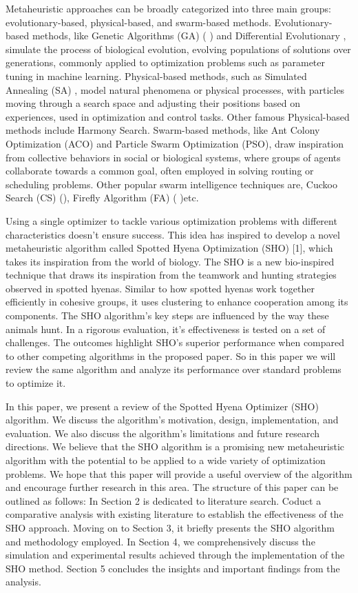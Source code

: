 \documentclass[12pt]{article}
\begin{document}
Metaheuristic approaches can be broadly categorized into three main groups: evolutionary-based, physical-based, and swarm-based methods. 
Evolutionary-based methods, like Genetic Algorithms (GA) ( \cite{mirjalili2019genetic}) and Differential Evolutionary , simulate the process of biological evolution, evolving populations of solutions over generations, commonly applied to optimization problems such as parameter tuning in machine learning. 
Physical-based methods, such as Simulated Annealing (SA) , model natural phenomena or physical processes, with particles moving through a search space and adjusting their positions based on experiences, used in optimization and control tasks. Other famous Physical-based methods include Harmony Search. 
Swarm-based methods, like Ant Colony Optimization (ACO) and Particle Swarm Optimization (PSO), draw inspiration from collective behaviors in social or biological systems, where groups of agents collaborate towards a common goal, often employed in solving routing or scheduling problems.
Other popular swarm intelligence techniques are, Cuckoo Search (CS) (\cite{yang2010engineering}), Firefly Algorithm (FA) (\cite{yang2010firefly} )etc.

Using a single optimizer to tackle various optimization problems with different characteristics doesn't ensure success. This idea has inspired to develop a novel metaheuristic algorithm called Spotted Hyena Optimization (SHO) [1], which takes its inspiration from the world of biology. 
The SHO is a new bio-inspired technique that draws its inspiration from the teamwork and hunting strategies observed in spotted hyenas. Similar to how spotted hyenas work together efficiently in cohesive groups, it uses clustering to enhance cooperation among its components. 
The SHO algorithm's key steps are influenced by the way these animals hunt. In a rigorous evaluation, it's effectiveness is tested on a set of challenges. 
The outcomes highlight SHO's superior performance when compared to other competing algorithms in the proposed paper.   
So in this paper we will review the same algorithm and analyze its performance over standard problems to optimize it.

In this paper, we present a review of the Spotted Hyena Optimizer (SHO) algorithm. We discuss the algorithm's motivation, design, implementation, and evaluation. We also discuss the algorithm's limitations and future research directions. We believe that the SHO algorithm is a promising new metaheuristic algorithm with the potential to be applied to a wide variety of optimization problems. We hope that this paper will provide a useful overview of the algorithm and encourage further research in this area. The structure of this paper can be outlined as follows: In Section 2 is dedicated to literature search. Coduct a comparative analysis with existing literature to establish the effectiveness of the SHO approach. Moving on to Section 3, it briefly presents the SHO algorithm and methodology employed. 
In Section 4, we comprehensively discuss the simulation and experimental results achieved through the implementation of the SHO method. 
Section 5 concludes the insights and important findings from the analysis.
\end{document}
